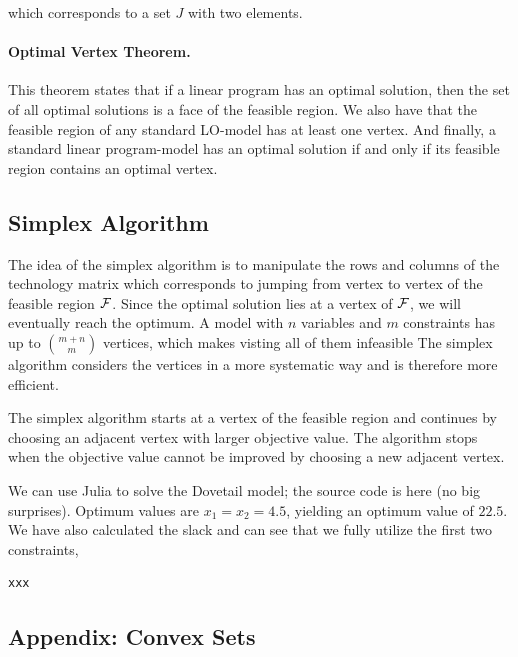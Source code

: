 which corresponds to a set $J$ with two elements.


\paragraph{Optimal Vertex Theorem.} This theorem states that if a linear program has an optimal solution, then the set of all optimal solutions is a face of the feasible region. We also have that the feasible region of any standard LO-model has at least one vertex. And finally, a standard linear program-model has an optimal solution if and only if its feasible region contains an optimal vertex.






\subsection{Simplex Algorithm}

The idea of the simplex algorithm is to manipulate the rows and columns of the technology matrix which corresponds to jumping from vertex to vertex of the feasible region $\mathcal{F}$. Since the optimal solution lies at a vertex of $\mathcal{F}$, we will eventually reach the optimum. A model with $n$ variables and $m$ constraints has up to ${m+n \choose m}$ vertices, which makes visting all of them infeasible The simplex algorithm considers the vertices in a more systematic way and is therefore more efficient. 

The simplex algorithm starts at a vertex of the feasible region and continues by choosing an adjacent vertex with larger objective value. The algorithm stops when the objective value cannot be improved by choosing a new adjacent vertex.


We can use Julia to solve the Dovetail model; the source code is here (no big surprises). Optimum values are $x_1 = x_2 = 4.5$, yielding an optimum value of $22.5$. We have also calculated the slack and can see that we fully utilize the first two constraints,

\begin{verbatim}
xxx
\end{verbatim}

\subsection{Appendix: Convex Sets}

